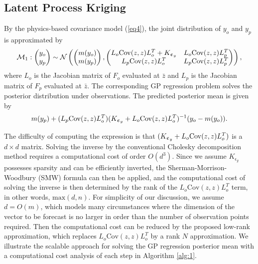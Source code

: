 \documentclass[article,ij4uq]{ij4uq}              %
\begin{document}
\subsection{Latent Process Kriging}\label{sec:lpf}
\par By the physics-based covariance model (\ref{eq4}), the joint distribution of $y_{o}$ and $y_{p}$ is approximated by
\begin{align}
    \mathcal{M}_{1}: \begin{pmatrix}y_{o}\\y_{p}\end{pmatrix}\sim\mathcal{N}\left(\begin{pmatrix}m(y_{o})\\m(y_{p})\end{pmatrix},\begin{pmatrix}L_{o}{\rm{Cov}}(z,z)L_{o}^{T}+K_{\epsilon_{y}} & L_{o}{\rm{Cov}}(z,z)L_{p}^{T}\\L_{p}{\rm{Cov}}(z,z)L_{o}^{T} & L_{p}{\rm{Cov}}(z,z)L_{p}^{T}\end{pmatrix}\right),\label{eq18}
\end{align}
where $L_{o}$ is the Jacobian matrix of $F_{o}$ evaluated at $\bar{z}$ and $L_{p}$ is the Jacobian matrix of $F_{p}$ evaluated at $\bar{z}$. The corresponding GP regression problem solves the posterior distribution under observations. The predicted posterior mean is given by
\begin{align}
    m(y_{p})+(L_{p}{\rm{Cov}}(z,z)L_{o}^{T})(K_{\epsilon_{y}}+L_{o}{\rm{Cov}}(z,z)L_{o}^{T})^{-1}(y_{o}-m(y_{o})).\label{eq19}
\end{align}
\par The difficulty of computing the expression is that $(K_{\epsilon_{y}}+L_{o}{\rm{Cov}}(z,z)L_{o}^{T})$ is a $d\times d$ matrix. Solving the inverse by the conventional Cholesky decomposition method requires a computational cost of order $O(d^{3})$. Since we assume $K_{\epsilon_{y}}$ possesses sparsity and can be efficiently inverted, the Sherman-Morrison-Woodbury (SMW) formula can then be applied, and the computational cost of solving the inverse is then determined by the rank of the $L_{o}\mathrm{Cov}(z,z)L_{o}^{T}$ term, in other words, $\mathrm{max}(d,n)$. For simplicity of our discussion, we assume $d= O(m)$, which models many circumstances where 
 the dimension of the vector to be forecast is no larger in order than the number of observation points required. Then the computational cost can be reduced by the proposed low-rank approximation, which replaces $L_{o}\mathrm{Cov}(z,z)L_{o}^{T}$ by a rank $N$ approximation. We illustrate the scalable approach for solving the GP regression posterior mean with  a computational cost analysis of each step in Algorithm \ref{alg:1}.
\end{document}
